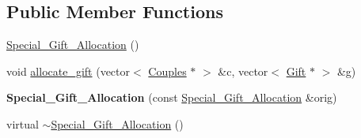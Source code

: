 \subsection*{Public Member Functions}
\begin{DoxyCompactItemize}
\item 
\hyperlink{class_special___gift___allocation_ac67a10742f77e6876774dd3babb60d1b}{Special\-\_\-\-Gift\-\_\-\-Allocation} ()
\item 
void \hyperlink{class_special___gift___allocation_a95d433a777e1c36120b30c9bee0ed75b}{allocate\-\_\-gift} (vector$<$ \hyperlink{class_couples}{Couples} $\ast$ $>$ \&c, vector$<$ \hyperlink{class_gift}{Gift} $\ast$ $>$ \&g)
\item 
\hypertarget{class_special___gift___allocation_a0537ebe4f8d2d11930436669541764d8}{{\bfseries Special\-\_\-\-Gift\-\_\-\-Allocation} (const \hyperlink{class_special___gift___allocation}{Special\-\_\-\-Gift\-\_\-\-Allocation} \&orig)}\label{class_special___gift___allocation_a0537ebe4f8d2d11930436669541764d8}

\item 
virtual \hyperlink{class_special___gift___allocation_ad7e5632cdd314289a21f2da4e427a634}{$\sim$\-Special\-\_\-\-Gift\-\_\-\-Allocation} ()
\end{DoxyCompactItemize}


